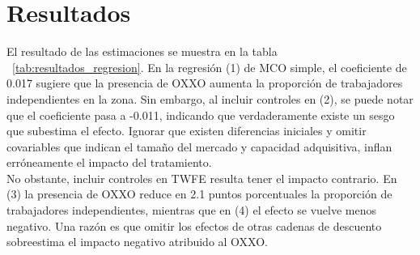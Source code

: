 \documentclass{article}
\begin{document}
\section{Resultados}
El resultado de las estimaciones se muestra en la tabla ~\ref{tab:resultados_regresion}. 
En la regresión (1) de MCO simple, el coeficiente de 0.017 sugiere que la presencia de OXXO aumenta la proporción de trabajadores independientes en la zona. 
Sin embargo, al incluir controles en (2), se  puede notar que el coeficiente pasa a -0.011, indicando que verdaderamente existe un sesgo que subestima el efecto. 
Ignorar que existen diferencias iniciales y omitir covariables que indican el tamaño del mercado y capacidad adquisitiva, inflan erróneamente el impacto del tratamiento.\\

No obstante, incluir controles en TWFE resulta tener el impacto contrario. 
En (3) la presencia de OXXO reduce en 2.1 puntos porcentuales la proporción de trabajadores independientes, mientras que en (4) el efecto se vuelve menos negativo. 
Una razón es que omitir los efectos de otras cadenas de descuento sobreestima el impacto negativo atribuido al OXXO. \\
\end{document}
